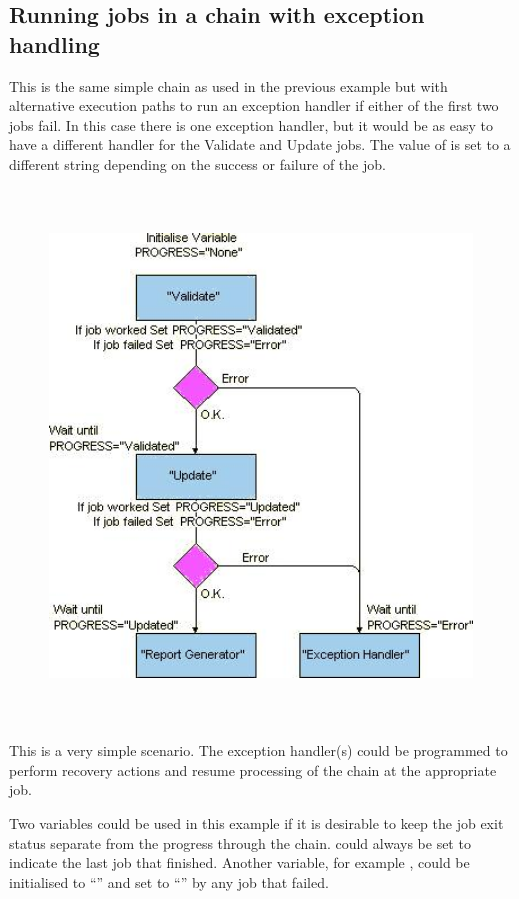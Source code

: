 \subsection{Running jobs in a chain with exception handling}
This is the same simple chain as used in the previous example but with alternative execution paths to run an exception handler if either of
the first two jobs fail. In this case there is one exception handler, but it would be as easy to have a different handler for the Validate
and Update jobs. The value of  is set to a different string depending on the success or failure of the job.

\begin{figure}
\centering
\includegraphics[width=15.854cm,height=14.131cm]{img/ref7.jpg}
\end{figure}
This is a very simple scenario. The exception handler(s) could be programmed to perform recovery actions and resume processing of the
chain at the appropriate job.

Two variables could be used in this example if it is desirable to keep the job exit status separate from the progress through the chain.
 could always be set to indicate the last job that finished. Another variable, for example ,
could be initialised to ``'' and set to ``'' by any job that failed.

